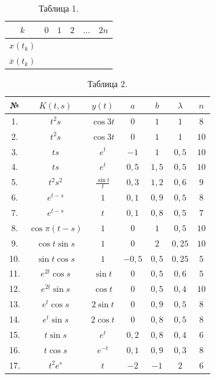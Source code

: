 \documentclass[12pt,a4paper]{article}
\begin{document}
\begin{table}[ht!]
\centering
\caption*{Таблица 1.}
\begin{tabular}{|c|c|c|c|c|}
\hline
$k$ & $0$ & $1$ & $2$ & $\dots \quad 2n$ \\
\hline
$x(t_{k})$ & & & & \\
\hline
$\overline{x}(t_{k})$ & & & & \\
\hline
\end{tabular}
\end{table}

\begin{table}[ht!]
\centering
\caption*{Таблица 2.}
\begin{tabular}{|c|c|c|c|c|c|c|}
\hline
№ & $K(t,s)$ & $y(t)$ & $a$ & $b$ & $\lambda$ & $n$ \\
\hline
1. & $t^{2}s$ & $\cos 3t$ & $0$ & $1$ & $1$ & $8$ \\
\hline
2. & $t^{2}s$ & $\cos 3t$ & $0$ & $1$ & $1$ & $10$ \\
\hline
3. & $ts$ & $e^{t}$ & $-1$ & $1$ & $0,5$ & $10$ \\
\hline
4. & $ts$ & $e^{t}$ & $0,5$ & $1,5$ & $0,5$ & $10$ \\
\hline
5. & $t^{2}s^{2}$ & $\frac{\sin t}{t}$ & $0,3$ & $1,2$ & $0,6$ & $9$ \\
\hline
6. & $e^{t-s}$ & $1$ & $0,1$ & $0,9$ & $0,5$ & $8$ \\
\hline
7. & $e^{t-s}$ & $t$ & $0,1$ & $0,8$ & $0,5$ & $7$ \\
\hline
8. & $\cos \pi(t-s)$ & $1$ & $0$ & $1$ & $0,5$ & $10$ \\
\hline
9. & $\cos t \sin s$ & $1$ & $0$ & $2$ & $0,25$ & $10$ \\
\hline
10. & $\sin t \cos s$ & $1$ & $-0,5$ & $0,5$ & $0,25$ & $5$ \\
\hline
11. & $e^{2t}\cos s$ & $\sin t$ & $0$ & $0,5$ & $0,6$ & $5$ \\
\hline
12. & $e^{2t}\sin s$ & $\cos t$ & $0$ & $0,5$ & $0,4$ & $10$ \\
\hline
13. & $e^{t}\cos s$ & $2\sin t$ & $0$ & $0,9$ & $0,5$ & $8$ \\
\hline
14. & $e^{t}\sin s$ & $2\cos t$ & $0$ & $0,8$ & $0,5$ & $8$ \\
\hline
15. & $t\sin s$ & $e^{t}$ & $0,2$ & $0,8$ & $0,4$ & $6$ \\
\hline
16. & $t\cos s$ & $e^{-t}$ & $0,1$ & $0,9$ & $0,3$ & $8$ \\
\hline
17. & $t^{2}e^{s}$ & $t$ & $-2$ & $-1$ & $2$ & $6$ \\
\hline
\end{tabular}
\end{table}
\end{document}
